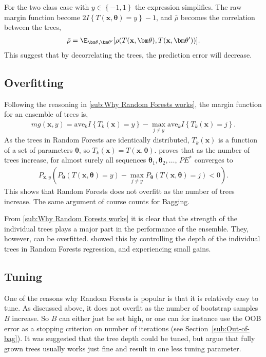 For the two class case with $y \in \left\{ -1, 1 \right\}$ the expression simplifies. The raw margin function become $2 I\left\{ T(\mathbf{x}, \bm \theta) = y \right\} - 1$, and $\bar \rho$ becomes the correlation between the trees,
\begin{align}
  \bar \rho = \E_{\bm \theta, \bm \theta'}[\rho(T(\mathbf{x}, \bm \theta), T(\mathbf{x}, \bm \theta'))]. 
\end{align}
This suggest that by decorrelating the trees, the prediction error will decrease. 



\subsection{Overfitting}
\label{sub:Overfitting}
Following the reasoning in \ref{sub:Why Random Forests works}, the margin function for an ensemble of trees is,
\begin{align}
  mg(\mathbf{x}, y) = \mathrm{ave}_k I\left\{ T_k(\mathbf{x}) = y \right\} - 
  \max_{j \neq y} \mathrm{ave}_k I\left\{ T_k(\mathbf{x}) = j \right\}.
\end{align}
As the trees in Random Forests are identically distributed, $T_k(\mathbf{x})$ is a function of a set of parameters $\bm \theta$, so $T_k(\mathbf{x}) = T(\mathbf{x}, \bm \theta)$. \cite{randomforests} proves that as the number of trees increase, for almost surely all sequences $\bm \theta_1, \bm \theta_2, \ldots$, $PE^*$ converges to 
\begin{align}
  P_{\mathbf{x}, y} (P_{\bm \theta} (T(\mathbf{x}, \bm \theta) = y) - \max_{j \neq y} P_{\bm \theta}(T(\mathbf{x}, \bm \theta) = j) < 0).
\end{align}
This shows that Random Forests does not overfitt as the number of trees increase. The same argument of course counts for Bagging. 

From \ref{sub:Why Random Forests works} it is clear that the strength of the individual trees plays a major part in the performance of the ensemble. They, however, can be overfitted. \cite{segal2004} showed this by controlling the depth of the individual trees in Random Forests regression, and experiencing small gains. 


\subsection{Tuning}
\label{sub:Tuning}
One of the reasons why Random Forests is popular is that it is relatively easy to tune. As discussed above, it does not overfit as the number of bootstrap samples $B$ increase. So $B$ can either just be set high, or one can for instance use the OOB error as a stopping criterion on number of iterations (see Section~\ref{sub:Out-of-bag}). It was suggested that the tree depth could be tuned, but \cite{modstat} argue that fully grown trees usually works just fine and result in one less tuning parameter. 

